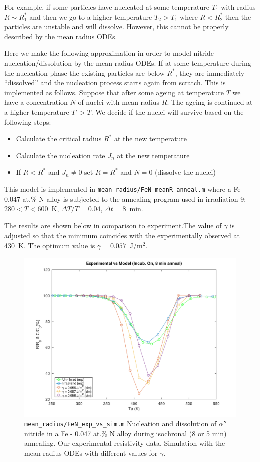 \documentclass[12pt,a4paper]{article}
\begin{document}
For example, if some particles have nucleated at some temperature $T_1$ with radius $R\sim R_1^*$ and then we go to a higher temperature $T_2>T_1$ where $R<R_2^*$ then the particles are unstable and will dissolve. However, this cannot be properly described by the mean radius ODEs.

Here we make the following approximation in order to model nitride nucleation/dissolution by the mean radius ODEs. If at some temperature during the nucleation phase the existing particles are below $R^*$, they are immediately ``dissolved'' and the nucleation process starts again from scratch. This is implemented as follows. Suppose that after some ageing at temperature $T$ we have a concentration $N$ of nuclei with mean radius $R$. The ageing is continued at a higher temperature $T'>T$. We decide if the nuclei will survive based  on the following steps:
\begin{itemize}
\item Calculate the critical radius $R^*$ at the new temperature
\item Calculate the nucleation rate $J_n$ at the new temperature
\item If $R<R^*$ and $J_n \neq 0$ set $R=R^*$ and $N=0$ (dissolve the nuclei)
\end{itemize}

This model is implemented in \texttt{mean\_radius/FeN\_meanR\_anneal.m} where a Fe - 0.047 at.\% N alloy is subjected to the annealing program used in irradiation 9: $280 < T < 600$~K, $\Delta T/T=0.04$, $\Delta t=8$~min.

The results are shown below in comparison to experiment.The value of $\gamma$ is adjusted so that the minimum coincides with the experimentally observed at 430~K. The optimum value is $\gamma=0.057$~J/m$^2$.

\begin{figure}[b]
\centering
\includegraphics[width=14cm]{../mean_radius/FeN_exp_vs_sim} 
\caption{\texttt{mean\_radius/FeN\_exp\_vs\_sim.m} Nucleation and dissolution of $\alpha ''$ nitride in a Fe - 0.047 at.\% N alloy during isochronal (8 or 5 min) annealing. Our experimental resistivity data. Simulation with the mean radius ODEs with different values for $\gamma$. }
\end{figure}
\end{document}
